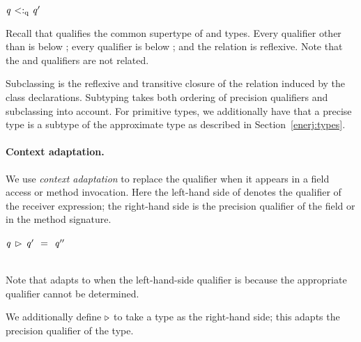 \vspace{0.5ex}
\noindent
\begin{ottdefnblock}[#1]{$ \mathit{q} \  \textsf{$<:_{\mathrm{q}}$} \  \mathit{q'} $}{}
\ottusedrule{\ottdruleqqXXlost{}} \hspace{1em}
\ottusedrule{\ottdruleqqXXtop{}} \hspace{1em}
\ottusedrule{\ottdruleqqXXrefl{}}\\
\end{ottdefnblock}

\noindent
Recall that \top{} qualifies the common supertype of \precise{} and
\approx{} types.
Every qualifier other than \top{} is below \lost{};
every qualifier is below \top{}; and the relation is
reflexive.
Note that the \precise{} and \approx{} qualifiers are not
related.

Subclassing is the reflexive and transitive closure of the relation
induced by the class declarations.
Subtyping takes both ordering of precision qualifiers and subclassing
into account.
For primitive types, we additionally have that a precise type is a
subtype of the approximate type as described in Section~\ref{enerj:types}.


\paragraph{Context adaptation.}

We use \emph{context adaptation} to replace the \context{} qualifier
when it appears in a field
access or method invocation. Here the left-hand side
of \comb{} denotes the qualifier of the receiver expression;
the right-hand side is the precision qualifier of the field or in the method
signature.

\vspace{0.5ex}
\noindent
\begin{ottdefnblock}[#1]{$ \ottnt{q} \, \rhd\,  \ottnt{q'} \ \  \textsf{=} \ \  \ottnt{q''} $}{}
\ottusedrule{\hfill \ottdruleqcqXXcontext{} \hfill}\\[2mm]
\ottusedrule{\ottdruleqcqXXlost{} \hfill
\ottdruleqcqXXfixed{}\ \ }\\
\end{ottdefnblock}

\noindent
Note that \context{} adapts to \lost{} when the left-hand-side qualifier
is \top{} because the appropriate qualifier cannot be determined.

We additionally define $\triangleright$ to take a type as the
right-hand side; this adapts the precision qualifier of the type.



